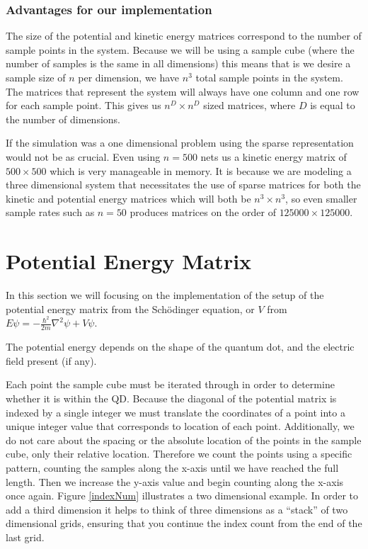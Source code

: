 \documentclass[authoryearcitations]{UoYCSproject}
\begin{document}
\subsubsection{Advantages for our implementation}
The size of the potential and kinetic energy matrices correspond to the number of sample points in the system. 
Because we will be using a sample cube (where the number of samples is the same in all dimensions) this means
that is we desire a sample size of $n$ per dimension, we have $n^3$ total sample points in the system. The 
matrices that represent the system will always have one column and one row for each sample point. This gives
us $n^D \times n^D$ sized matrices, where $D$ is equal to the number of dimensions. 

If the simulation was a one dimensional problem
using the sparse representation would not be as crucial. Even using $n = 500$ nets us a kinetic energy matrix of
$500 \times 500$ which is very manageable in memory. It is because we are modeling a three dimensional system that
necessitates the use of sparse matrices for both the kinetic and potential energy matrices which will both be
$n^3 \times n^3$, so even smaller sample rates such as $n = 50$ produces matrices on the order of $125000 \times 125000$.




\section{Potential Energy Matrix}
\label{sec:potential}
In this section we will focusing on the implementation of the setup of the potential energy matrix
from the Sch\"{o}dinger equation, or $V$ from $E\psi = -\frac{\hbar ^2}{2m}\nabla ^2\psi + V\psi $.

The potential energy depends on the shape of the quantum dot, and the electric field present (if any). 



Each point the sample cube must be iterated through in order to determine whether it is within the QD. 
Because the diagonal of the potential matrix is indexed by a single integer we must translate the 
coordinates of a point into a unique integer value 
that corresponds to location of each point. Additionally, we do not care about the spacing or the absolute location
of the points in
the sample cube, only their relative location. Therefore we count the points using a specific pattern, counting
the samples along the x-axis until we have reached the full length. Then we increase the y-axis value and
begin counting along the x-axis once again. Figure \ref{indexNum} illustrates a two dimensional example. 
In order to add a third dimension it helps to think of three dimensions as a ``stack'' of  two dimensional grids,
ensuring that you continue the index count from the end of the last grid.
\end{document}
